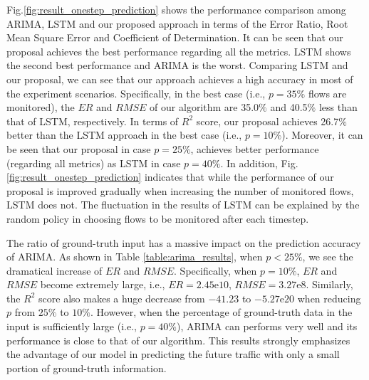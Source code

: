Fig.\ref{fig:result_onestep_prediction} shows the performance comparison among ARIMA, LSTM and our proposed approach in terms of the Error Ratio, Root Mean Square Error and Coefficient of Determination. 
It can be seen that our proposal achieves the best performance regarding all the metrics. LSTM shows the second best performance and ARIMA is the worst. Comparing LSTM and our proposal, we can see that our approach achieves a high accuracy in most of the experiment scenarios. Specifically, in the best case (i.e., $p=35\%$ flows are monitored), the $ER$ and $RMSE$ of our algorithm are 35.0$\%$ and 40.5$\%$ less than that of LSTM, respectively. 
In terms of $R^2$ score, our proposal achieves 26.7$\%$ better than the LSTM approach in the best case (i.e., $p=10\%$). Moreover, it can be seen that our proposal in case $p=25\%$, achieves better performance (regarding all metrics) as LSTM in case $p=40\%$.
In addition, Fig.\ref{fig:result_onestep_prediction} indicates that while the performance of our proposal is improved gradually when increasing the number of monitored flows, LSTM does not.
The fluctuation in the results of LSTM can be explained by the random policy in choosing flows to be monitored after each timestep. 

The ratio of ground-truth input has a massive impact on the prediction accuracy of ARIMA. As shown in Table \ref{table:arima_results}, when $p < 25\%$, we see the dramatical increase of $ER$ and $RMSE$. Specifically, when $p = 10\%$, $ER$ and $RMSE$ become extremely large, i.e., $ER=2.45\mathrm{e}10$, $RMSE=3.27\mathrm{e}8$.
Similarly, the $R^2$ score also makes a huge decrease from $-41.23$ to $-5.27\mathrm{e}20$ when reducing $p$ from $25\%$ to $10\%$. However, when the percentage of ground-truth data in the input is sufficiently large (i.e., $p = 40\%$), ARIMA can performs very well and its performance is close to that of our algorithm. This results strongly emphasizes the advantage of our model in predicting the future traffic with only a small portion of ground-truth information.

